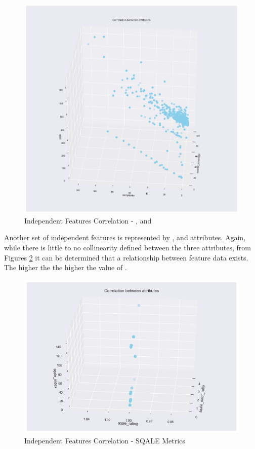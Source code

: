 \begin{figure}[!h]
    \centering
    \includegraphics[scale=0.5]{Figures/independent-feat-trends/Correlation_between_attributes_overall_coverage_complexity_ncloc.png}
    \caption{Independent Features Correlation - \overallCoverage{}, \complexity{} and \ncloc{}}
    \label{fig:corr:post-transformation:overallCoverage-complexity-ncloc}
\end{figure}

Another set of independent features is represented by \sqaleIndex{}, \sqaleRating{} and \sqaleDebtRatio{} attributes. Again, while there is little to no collinearity defined between the three attributes, from Figures \ref{fig:corr:post-transformation:sqale} it can be determined that a relationship between feature data exists. The higher the \sqaleIndex{} the higher the value of \sqaleDebtRatio{}. 
\begin{figure}
    \centering
    \includegraphics[scale=0.7]{Figures/independent-feat-trends/Correlation_between_attributes_sqale_debt_ratio_sqale_rating_sqale_index.png}
    \caption{Independent Features Correlation - SQALE Metrics}
    \label{fig:corr:post-transformation:sqale}
\end{figure}

